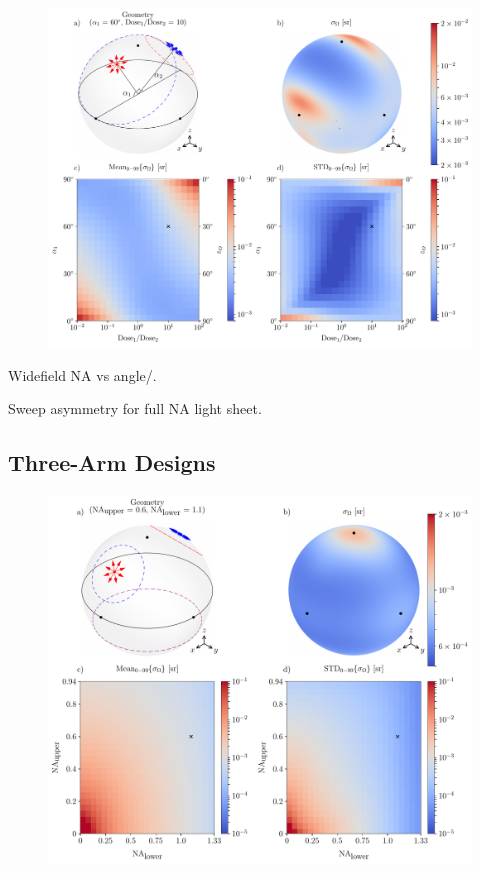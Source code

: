 \documentclass[10pt]{article}
\begin{document}
\begin{figure}[htbp]
\centering\includegraphics[width=\textwidth]{asymmetric-double}
\caption{}
\end{figure}


Widefield NA vs angle/.

Sweep asymmetry for full NA light sheet.



\subsection{Three-Arm Designs}
\begin{figure}[htbp]
\centering\includegraphics[width=\textwidth]{triple-arm}
\caption{}
\end{figure}
\end{document}
